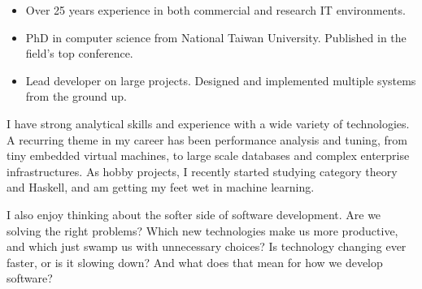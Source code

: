 \documentclass[10pt,a4paper]{../altacv}
\begin{document}
	
	\begin{fullwidth}
		\makecvheader
		
		\begin{itemize}
			\item Over 25 years experience in both commercial and research IT environments.
			\item PhD in computer science from National Taiwan University. Published in the field’s top conference. 
			\item Lead developer on large projects. Designed and implemented multiple systems from the ground up.
		\end{itemize}
		
		\medskip
		
		I have strong analytical skills and experience with a wide variety of technologies. A recurring theme in my career has been performance analysis and tuning, from tiny embedded virtual machines, to large scale databases and complex enterprise infrastructures. As hobby projects, I recently started studying category theory and Haskell, and am getting my feet wet in machine learning.
		
		\medskip
		
		I also enjoy thinking about the softer side of software development. Are we solving the right problems? Which new technologies make us more productive, and which just swamp us with unnecessary choices? Is technology changing ever faster, or is it slowing down? And what does that mean for how we develop software?
		
	\end{fullwidth}
	
	\small
	
	
\end{document}
